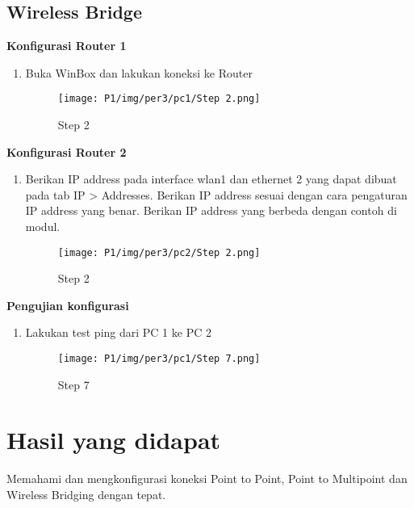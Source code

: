 \begin{enumerate}
\begin{center}
\end{center}

\subsection{Wireless Bridge}
\begin{center}

	\textbf{Konfigurasi Router 1}
	\begin{enumerate}
		\item Buka WinBox dan lakukan koneksi ke Router
		      \begin{figure}[H]
			      \centering
			      \texttt{[image: P1/img/per3/pc1/Step 2.png]}
			      \caption{Step 2}
			      \label{fig:Step 2(Per.3 PC1)}
		      \end{figure}
	\end{enumerate}

	\textbf{Konfigurasi Router 2}
	\begin{enumerate}
		\item Berikan IP address pada interface wlan1 dan ethernet 2 yang dapat dibuat pada tab IP > Addresses. Berikan IP address sesuai dengan cara pengaturan IP address yang benar. Berikan IP address yang berbeda dengan contoh di modul.
		      \begin{figure}[H]
			      \centering
			      \texttt{[image: P1/img/per3/pc2/Step 2.png]}
			      \caption{Step 2}
			      \label{fig:Step 2(Per.3 PC2)}
		      \end{figure}
	\end{enumerate}

	\textbf{Pengujian konfigurasi}
	\begin{enumerate}
		\item Lakukan test ping dari PC 1 ke PC 2
		      \begin{figure}[H]
			      \centering
			      \texttt{[image: P1/img/per3/pc1/Step 7.png]}
			      \caption{Step 7}
			      \label{fig:Step 7(Per.3 PC1)}
		      \end{figure}
	\end{enumerate}

\end{center}

\section{Hasil yang didapat}
Memahami dan mengkonfigurasi koneksi Point to Point, Point to Multipoint dan Wireless
Bridging dengan tepat.


\end{enumerate}
